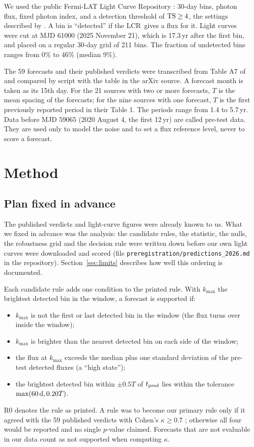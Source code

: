 \documentclass[twocolumn]{aastex631}
\newcommand{\LCR}{LCR}
\begin{document}
We used the public Fermi-LAT Light Curve Repository \citep[\LCR;][]{abdollahi23}: 30-day bins, photon flux, fixed photon index, and a detection threshold of ${\rm TS}\ge4$, the settings described by \citet{penil26}. A bin is ``detected'' if the \LCR\ gives a flux for it. Light curves were cut at MJD 61000 (2025 November 21), which is 17.3\,yr after the first bin, and placed on a regular 30-day grid of 211 bins. The fraction of undetected bins ranges from 0\% to 46\% (median 9\%).

The 59 forecasts and their published verdicts were transcribed from Table A7 of \citet{penil26} and compared by script with the table in the arXiv source. A forecast month is taken as its 15th day. For the 21 sources with two or more forecasts, $T$ is the mean spacing of the forecasts; for the nine sources with one forecast, $T$ is the first previously reported period in their Table 1. The periods range from 1.4 to 5.7\,yr. Data before MJD 59065 (2020 August 4, the first 12\,yr) are called pre-test data. They are used only to model the noise and to set a flux reference level, never to score a forecast.

\section{Method} \label{sec:method}

\subsection{Plan fixed in advance} \label{sec:plan}

The published verdicts and light-curve figures were already known to us. What we fixed in advance was the analysis: the candidate rules, the statistic, the nulls, the robustness grid and the decision rule were written down before our own light curves were downloaded and scored (file \texttt{preregistration/predictions\_2026.md} in the repository). Section~\ref{sec:limits} describes how well this ordering is documented.

Each candidate rule adds one condition to the printed rule. With $k_{\max}$ the brightest detected bin in the window, a forecast is supported if:
\begin{itemize}
\item[R1] $k_{\max}$ is not the first or last detected bin in the window (the flux turns over inside the window);
\item[R2] $k_{\max}$ is brighter than the nearest detected bin on each side of the window;
\item[R3] the flux at $k_{\max}$ exceeds the median plus one standard deviation of the pre-test detected fluxes (a ``high state'');
\item[R4] the brightest detected bin within $\pm0.5T$ of $t_{\rm pred}$ lies within the tolerance $\max(60\,{\rm d}, 0.20T)$.
\end{itemize}
R0 denotes the rule as printed. A rule was to become our primary rule only if it agreed with the 59 published verdicts with Cohen's $\kappa \ge 0.7$ \citep{cohen60}; otherwise all four would be reported and no single $p$-value claimed. Forecasts that are not evaluable in our data count as not supported when computing $\kappa$.
\end{document}
